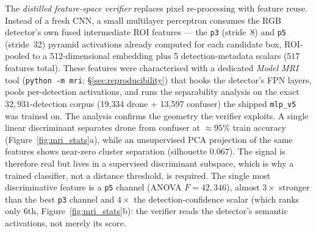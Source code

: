 \documentclass[12pt,a4paper,oneside,openright]{book}
\begin{document}
The \emph{distilled feature-space verifier} replaces pixel re-processing with feature reuse. Instead of a fresh CNN, a small multilayer perceptron consumes the RGB detector's own fused intermediate ROI features --- the \texttt{p3} (stride~8) and \texttt{p5} (stride~32) pyramid activations already computed for each candidate box, ROI-pooled to a 512-dimensional embedding plus 5 detection-metadata scalars ($517$ features total). These features were characterised with a dedicated \emph{Model MRI} tool (\texttt{python -m mri}; \S\ref{sec:reproducibility}) that hooks the detector's FPN layers, pools per-detection activations, and runs the separability analysis on the exact $32{,}931$-detection corpus (19{,}334 drone + 13{,}597 confuser) the shipped \texttt{mlp\_v5} was trained on. The analysis confirms the geometry the verifier exploits. A single linear discriminant separates drone from confuser at $\approx 95\%$ train accuracy (Figure~\ref{fig:mri_stats}a), while an unsupervised PCA projection of the same features shows near-zero cluster separation (silhouette $0.067$). The signal is therefore real but lives in a supervised discriminant subspace, which is why a trained classifier, not a distance threshold, is required. The single most discriminative feature is a \texttt{p5} channel (ANOVA $F=42{,}346$), almost $3\times$ stronger than the best \texttt{p3} channel and $4\times$ the detection-confidence scalar (which ranks only 6th, Figure~\ref{fig:mri_stats}b): the verifier reads the detector's semantic activations, not merely its score.
\end{document}
